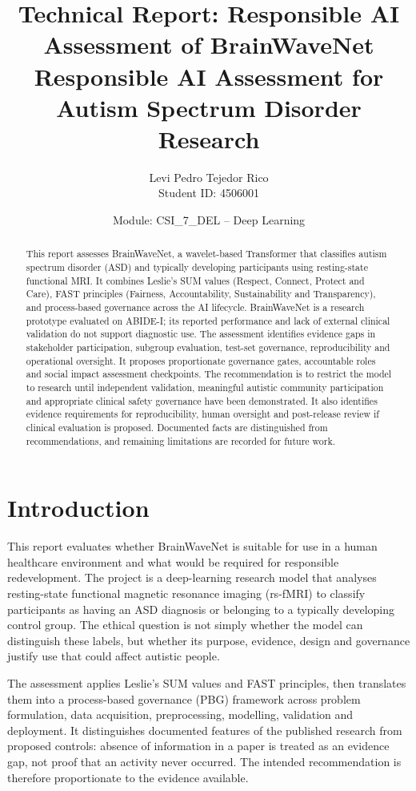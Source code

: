 \documentclass[11pt,a4paper]{article}
\title{\textbf{Technical Report: Responsible AI Assessment of BrainWaveNet}\\
\large Responsible AI Assessment for Autism Spectrum Disorder Research}
\author{Levi Pedro Tejedor Rico\\Student ID: 4506001}
\date{Module: CSI\_7\_DEL -- Deep Learning}
\begin{document}
\maketitle

\begin{abstract}
This report assesses BrainWaveNet, a wavelet-based Transformer that classifies autism spectrum disorder (ASD) and typically developing participants using resting-state functional MRI. It combines Leslie's SUM values (Respect, Connect, Protect and Care), FAST principles (Fairness, Accountability, Sustainability and Transparency), and process-based governance across the AI lifecycle. BrainWaveNet is a research prototype evaluated on ABIDE-I; its reported performance and lack of external clinical validation do not support diagnostic use. The assessment identifies evidence gaps in stakeholder participation, subgroup evaluation, test-set governance, reproducibility and operational oversight. It proposes proportionate governance gates, accountable roles and social impact assessment checkpoints. The recommendation is to restrict the model to research until independent validation, meaningful autistic community participation and appropriate clinical safety governance have been demonstrated. It also identifies evidence requirements for reproducibility, human oversight and post-release review if clinical evaluation is proposed. Documented facts are distinguished from recommendations, and remaining limitations are recorded for future work.
\end{abstract}

\tableofcontents
\newpage

\section{Introduction}
This report evaluates whether BrainWaveNet is suitable for use in a human healthcare environment and what would be required for responsible redevelopment. The project is a deep-learning research model that analyses resting-state functional magnetic resonance imaging (rs-fMRI) to classify participants as having an ASD diagnosis or belonging to a typically developing control group. The ethical question is not simply whether the model can distinguish these labels, but whether its purpose, evidence, design and governance justify use that could affect autistic people.

The assessment applies Leslie's SUM values and FAST principles, then translates them into a process-based governance (PBG) framework across problem formulation, data acquisition, preprocessing, modelling, validation and deployment. It distinguishes documented features of the published research from proposed controls: absence of information in a paper is treated as an evidence gap, not proof that an activity never occurred. The intended recommendation is therefore proportionate to the evidence available.
\end{document}
